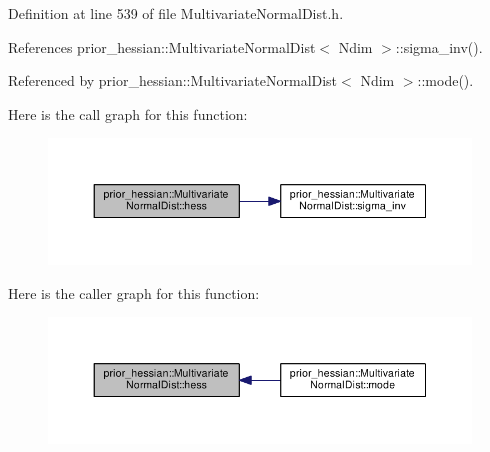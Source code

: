 Definition at line 539 of file Multivariate\+Normal\+Dist.\+h.



References prior\+\_\+hessian\+::\+Multivariate\+Normal\+Dist$<$ Ndim $>$\+::sigma\+\_\+inv().



Referenced by prior\+\_\+hessian\+::\+Multivariate\+Normal\+Dist$<$ Ndim $>$\+::mode().



Here is the call graph for this function\+:\nopagebreak
\begin{figure}[H]
\begin{center}
\leavevmode
\includegraphics[width=350pt]{classprior__hessian_1_1MultivariateNormalDist_aaf8d6241c639ee69c7854f392ba85480_cgraph}
\end{center}
\end{figure}




Here is the caller graph for this function\+:\nopagebreak
\begin{figure}[H]
\begin{center}
\leavevmode
\includegraphics[width=350pt]{classprior__hessian_1_1MultivariateNormalDist_aaf8d6241c639ee69c7854f392ba85480_icgraph}
\end{center}
\end{figure}


